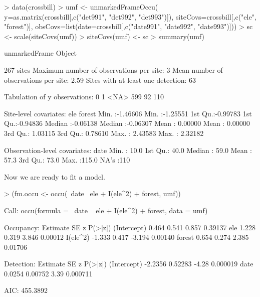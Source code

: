 \documentclass[a4paper]{article}
\renewenvironment{Schunk}{\vspace{\topsep}}{\vspace{\topsep}}
\begin{document}


\begin{Schunk}
\begin{Sinput}
> data(crossbill)
> umf <- unmarkedFrameOccu(
     y=as.matrix(crossbill[,c("det991", "det992", "det993")]),
     siteCovs=crossbill[,c("ele", "forest")],
     obsCovs=list(date=crossbill[,c("date991", "date992", "date993")]))
> sc <- scale(siteCovs(umf))
> siteCovs(umf) <- sc
> summary(umf)
\end{Sinput}
\begin{Soutput}
unmarkedFrame Object

267 sites
Maximum number of observations per site: 3 
Mean number of observations per site: 2.59 
Sites with at least one detection: 63 

Tabulation of y observations:
   0    1 <NA> 
 599   92  110 

Site-level covariates:
      ele               forest        
 Min.   :-1.46606   Min.   :-1.25551  
 1st Qu.:-0.99783   1st Qu.:-0.94836  
 Median :-0.06138   Median :-0.06307  
 Mean   : 0.00000   Mean   : 0.00000  
 3rd Qu.: 1.03115   3rd Qu.: 0.78610  
 Max.   : 2.43583   Max.   : 2.32182  

Observation-level covariates:
      date      
 Min.   : 10.0  
 1st Qu.: 40.0  
 Median : 59.0  
 Mean   : 57.3  
 3rd Qu.: 73.0  
 Max.   :115.0  
 NA's   :110    
\end{Soutput}
\end{Schunk}



Now we are ready to fit a model.

\begin{Schunk}
\begin{Sinput}
> (fm.occu <- occu(~date ~ele + I(ele^2) + forest, umf))
\end{Sinput}
\begin{Soutput}
Call:
occu(formula = ~date ~ ele + I(ele^2) + forest, data = umf)

Occupancy:
            Estimate    SE      z P(>|z|)
(Intercept)    0.464 0.541  0.857 0.39137
ele            1.228 0.319  3.846 0.00012
I(ele^2)      -1.333 0.417 -3.194 0.00140
forest         0.654 0.274  2.385 0.01706

Detection:
            Estimate      SE     z  P(>|z|)
(Intercept)  -2.2356 0.52283 -4.28 0.000019
date          0.0254 0.00752  3.39 0.000711

AIC: 455.3892 
\end{Soutput}
\end{Schunk}
\end{document}
